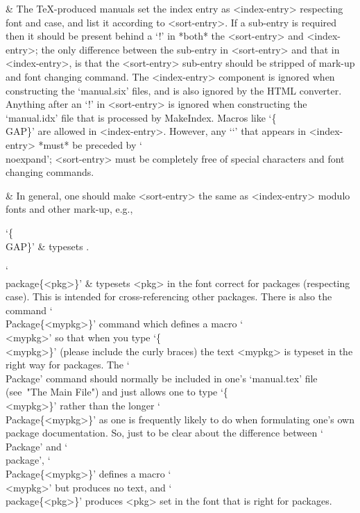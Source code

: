   & The {\TeX}-produced manuals set  the  index  entry  as  <index-entry>
    respecting font and case, and list it according to <sort-entry>. If a
    sub-entry is required then it should  be  present  behind  a  `!'  in
    *both*  the  <sort-entry>  and  <index-entry>;  the  only  difference
    between the sub-entry in <sort-entry> and that in  <index-entry>,  is
    that the <sort-entry> sub-entry should be  stripped  of  mark-up  and
    font changing command. The <index-entry> component  is  ignored  when
    constructing the `manual.six' files, and is also ignored by the  HTML
    converter. Anything after an `!'  in  <sort-entry>  is  ignored  when
    constructing the `manual.idx' file that is  processed  by  MakeIndex.
    Macros like `\{\\GAP\}' are allowed in  <index-entry>.  However,  any
    `\lq'  that  appears  in  <index-entry>   *must*   be   preceded   by
    `\\noexpand';  <sort-entry>  must  be  completely  free  of   special
    characters and font changing commands.

  & In general, one should make <sort-entry> the  same  as  <index-entry>
    modulo fonts and other mark-up, e.g.,

\begintt
{}
\endtt

`\{\\GAP\}' &
    typesets {\GAP}.

`\\package\{<pkg>\}' &
    typesets <pkg> in the font correct  for {\GAP}  packages  (respecting
    case). This is intended for cross-referencing  other {\GAP} packages.
    There  is  also  the  command  `\\Package\{<mypkg>\}'  command  which
    defines a macro `\\<mypkg>' so that  when  you  type  `\{\\<mypkg>\}'
    (please include the curly braces) the text <mypkg> is typeset in  the
    right way for {\GAP} packages. The `\\Package' command should normally
    be included in one's `manual.tex' file (see~"The Main File") and just
    allows  one  to  type  `\{\\<mypkg>\}'   rather   than   the   longer
    `\\Package\{<mypkg>\}'  as  one  is  frequently  likely  to  do  when
    formulating one's own {\GAP} package documentation.  So, just  to  be
    clear about  the  difference  between  `\\Package'  and  `\\package',
    `\\Package\{<mypkg>\}' defines a macro `\\<mypkg>'  but  produces  no
    text, and `\\package\{<pkg>\}' produces <pkg> set in the font that is
    right for {\GAP} packages.

